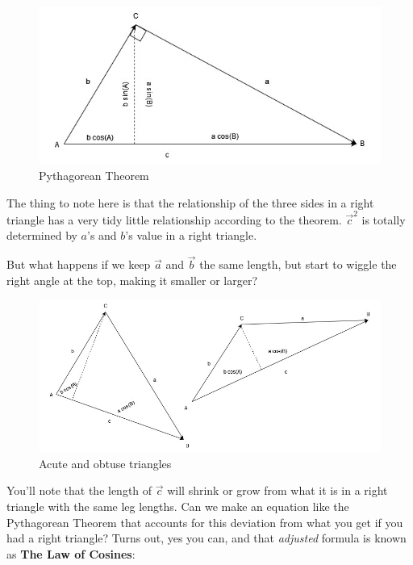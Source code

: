 \documentclass[
]{book}
\begin{document}
\begin{figure}

{\centering \includegraphics[width=0.75\linewidth,height=0.75\textheight]{images/LofC-PythThm} 

}

\caption{Pythagorean Theorem}\label{fig:unnamed-chunk-1}
\end{figure}

The thing to note here is that the relationship of the three sides in a right triangle has a very tidy little relationship according to the theorem. \(\vec{c}^2\) is totally determined by \(a\)'s and \(b\)'s value in a right triangle.

But what happens if we keep \(\vec{a}\) and \(\vec{b}\) the same length, but start to wiggle the right angle at the top, making it smaller or larger?

\begin{figure}

{\centering \includegraphics[width=0.75\linewidth,height=0.75\textheight]{images/LofC-acute-obtuse} 

}

\caption{Acute and obtuse triangles}\label{fig:unnamed-chunk-2}
\end{figure}

You'll note that the length of \(\vec{c}\) will shrink or grow from what it is in a right triangle with the same leg lengths. Can we make an equation like the Pythagorean Theorem that accounts for this deviation from what you get if you had a right triangle? Turns out, yes you can, and that \emph{adjusted} formula is known as \textbf{The Law of Cosines}:
\end{document}
